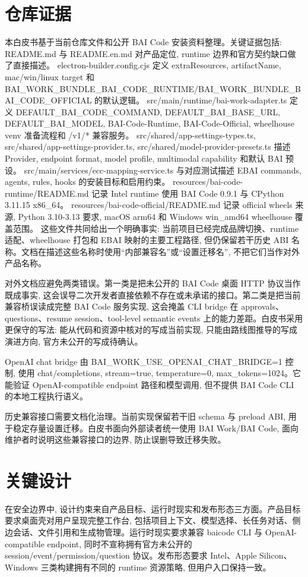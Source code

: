 \section{仓库证据}
本白皮书基于当前仓库文件和公开 BAI Code 安装资料整理。关键证据包括: README.md 与 README.en.md 对产品定位, runtime 边界和官方契约缺口做了直接描述。 electron-builder.config.cjs 定义 extraResources, artifactName, mac/win/linux target 和 BAI\_WORK\_BUNDLE\_BAI\_CODE\_RUNTIME/BAI\_WORK\_BUNDLE\_BAI\_CODE\_OFFICIAL 的默认逻辑。 src/main/runtime/bai-work-adapter.ts 定义 DEFAULT\_BAI\_CODE\_COMMAND, DEFAULT\_BAI\_BASE\_URL, DEFAULT\_BAI\_MODEL, BAI-Code-Runtime, BAI-Code-Official, wheelhouse venv 准备流程和 /v1/* 兼容服务。 src/shared/app-settings-types.ts, src/shared/app-settings-provider.ts, src/shared/model-provider-presets.ts 描述 Provider, endpoint format, model profile, multimodal capability 和默认 BAI 预设。 src/main/services/ecc-mapping-service.ts 与对应测试描述 EBAI commands, agents, rules, hooks 的安装目标和启用约束。 resources/bai-code-runtime/README.md 记录 Intel runtime 使用 BAI Code 0.9.1 与 CPython 3.11.15 x86\_64。 resources/bai-code-official/README.md 记录 official wheels 来源, Python 3.10-3.13 要求, macOS arm64 和 Windows win\_amd64 wheelhouse 覆盖范围。 这些文件共同给出一个明确事实: 当前项目已经完成品牌切换、runtime 适配、wheelhouse 打包和 EBAI 映射的主要工程路径, 但仍保留若干历史 ABI 名称。文档在描述这些名称时使用“内部兼容名”或“设置迁移名”, 不把它们当作对外产品名称。

对外文档应避免两类错误。第一类是把未公开的 BAI Code 桌面 HTTP 协议当作既成事实, 这会误导二次开发者直接依赖不存在或未承诺的接口。第二类是把当前兼容桥误读成完整 BAI Code 服务实现, 这会掩盖 CLI bridge 在 approvals、questions、resume session、tool-level semantic events 上的能力差距。白皮书采用更保守的写法: 能从代码和资源中核对的写成当前实现, 只能由路线图推导的写成演进方向, 官方未公开的写成待确认。

OpenAI chat bridge 由 BAI\_WORK\_USE\_OPENAI\_CHAT\_BRIDGE=1 控制, 使用 chat/completions, stream=true, temperature=0, max\_tokens=1024。它能验证 OpenAI-compatible endpoint 路径和模型调用, 但不提供 BAI Code CLI 的本地工程执行语义。

历史兼容接口需要文档化治理。当前实现保留若干旧 schema 与 preload ABI, 用于稳定存量设置迁移。白皮书面向外部读者统一使用 BAI Work/BAI Code, 面向维护者时说明这些兼容接口的边界, 防止误删导致迁移失败。

\section{关键设计}
在安全边界中, 设计约束来自产品目标、运行时现实和发布形态三方面。产品目标要求桌面壳对用户呈现完整工作台, 包括项目上下文、模型选择、长任务对话、侧边会话、文件引用和生成物管理。运行时现实要求兼容 baicode CLI 与 OpenAI-compatible endpoint, 同时不宣称拥有官方未公开的 session/event/permission/question 协议。发布形态要求 Intel、Apple Silicon、Windows 三类构建拥有不同的 runtime 资源策略, 但用户入口保持一致。


